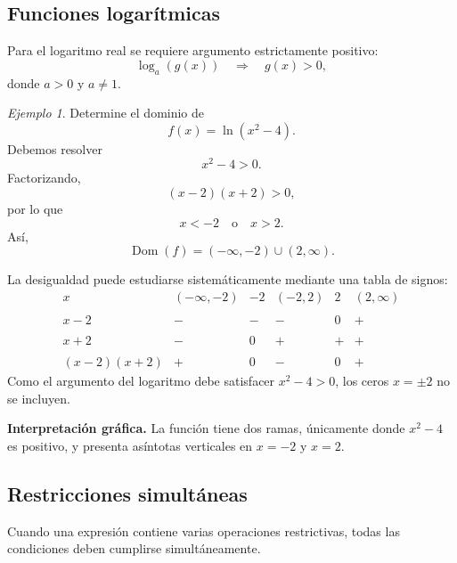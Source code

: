 \documentclass[12pt]{article}
\theoremstyle{remark}
\newtheorem{ejemplo}{Ejemplo}[section]
\newcommand{\Dom}{\operatorname{Dom}}
\begin{document}
\subsection{Funciones logarítmicas}

Para el logaritmo real se requiere argumento estrictamente positivo:
\[
\log_a(g(x))
\quad\Longrightarrow\quad
g(x)>0,
\]
donde $a>0$ y $a\neq1$.

\begin{ejemplo}
Determine el dominio de
\[
f(x)=\ln(x^2-4).
\]
Debemos resolver
\[
x^2-4>0.
\]
Factorizando,
\[
(x-2)(x+2)>0,
\]
por lo que
\[
x<-2\quad\text{o}\quad x>2.
\]
Así,
\[
\Dom(f)=(-\infty,-2)\cup(2,\infty).
\]

La desigualdad puede estudiarse sistemáticamente mediante una tabla de signos:
\[
\begin{array}{c|ccccc}
x&(-\infty,-2)&-2&(-2,2)&2&(2,\infty)\\\\ \hline
x-2&-&-&-&0&+\\\\
x+2&-&0&+&+&+\\\\ \hline
(x-2)(x+2)&+&0&-&0&+
\end{array}
\]
Como el argumento del logaritmo debe satisfacer $x^2-4>0$, los ceros
$x=\pm2$ no se incluyen.

\textbf{Interpretación gráfica.} La función tiene dos ramas, únicamente donde
$x^2-4$ es positivo, y presenta asíntotas verticales en $x=-2$ y $x=2$.
\begin{center}
\end{center}
\end{ejemplo}

\subsection{Restricciones simultáneas}

Cuando una expresión contiene varias operaciones restrictivas, todas las
condiciones deben cumplirse simultáneamente.
\end{document}
